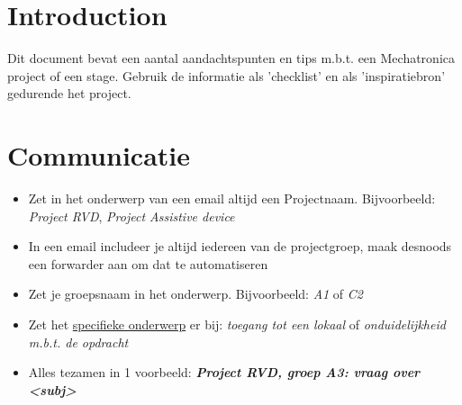 \documentclass[24pt,a4paper]{article}
\begin{document}
\captionsetup[table]{labelsep=endash}
\captionsetup[figure]{labelsep=endash}

\pagestyle{default}


\section{Introduction}
Dit document bevat een aantal aandachtspunten en tips m.b.t. een Mechatronica project of een stage.
Gebruik de informatie als 'checklist' en als 'inspiratiebron' gedurende het project.

\newcommand{\mssep}{
      \setlength{\itemsep}{1pt}
      \setlength{\parskip}{0pt}
      \setlength{\parsep}{0pt}
      \vspace{-1em}
}

\section{Communicatie}
\begin{itemize}
      \mssep
      \item Zet in het onderwerp van een email altijd een Projectnaam. Bijvoorbeeld: \textit{Project RVD}, \textit{Project Assistive device}
      \item In een email includeer je altijd iedereen van de projectgroep, maak desnoods een forwarder aan om dat te automatiseren
      \item Zet je groepsnaam in het onderwerp. Bijvoorbeeld: \textit{A1} of \textit{C2}
      \item Zet het \underline{specifieke onderwerp} er bij: \textit{toegang tot een lokaal} of \textit{onduidelijkheid m.b.t. de opdracht}
      \item Alles tezamen in 1 voorbeeld: \textbf{\textit{Project RVD, groep A3: vraag over <subj> }}
\end{itemize}
\end{document}

